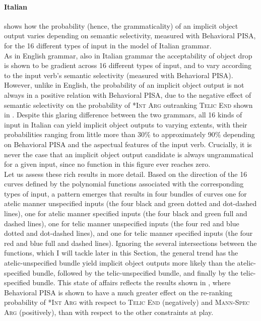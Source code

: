 \paragraph{Italian} 
 shows how the probability (hence, the grammaticality) of an implicit object output varies depending on semantic selectivity, measured with Behavioral PISA, for the 16 different types of input in the model of Italian grammar.\\
As in English grammar, also in Italian grammar the acceptability of object drop is shown to be gradient across 16 different types of input, and to vary according to the input verb's semantic selectivity (measured with Behavioral PISA). However, unlike in English, the probability of an implicit object output is not always in a positive relation with Behavioral PISA, due to the negative effect of semantic selectivity on the probability of \textsc{*Int Arg} outranking \textsc{Telic End} shown in . Despite this glaring difference between the two grammars, all 16 kinds of input in Italian can yield implicit object outputs to varying extents, with their probabilities ranging from little more than 30\% to approximately 90\% depending on Behavioral PISA and the aspectual features of the input verb. Crucially, it is never the case that an implicit object output candidate is always ungrammatical for a given input, since no function in this figure ever reaches zero.\\
Let us assess these rich results in more detail. Based on the direction of the 16 curves defined by the polynomial functions associated with the corresponding types of input, a pattern emerges that results in four bundles of curves \textemdash one for atelic manner unspecified inputs (the four black and green dotted and dot-dashed lines), one for atelic manner specified inputs (the four black and green full and dashed lines), one for telic manner unspecified inputs (the four red and blue dotted and dot-dashed lines), and one for telic manner specified inputs (the four red and blue full and dashed lines). Ignoring the several intersections between the functions, which I will tackle later in this Section, the general trend has the atelic-unspecified bundle yield implicit object outputs more likely than the atelic-specified bundle, followed by the telic-unspecified bundle, and finally by the telic-specified bundle. This state of affairs reflects the results shown in , where Behavioral PISA is shown to have a much greater effect on the re-ranking probability of \textsc{*Int Arg} with respect to \textsc{Telic End} (negatively) and \textsc{Mann-Spec Arg} (positively), than with respect to the other constraints at play.

